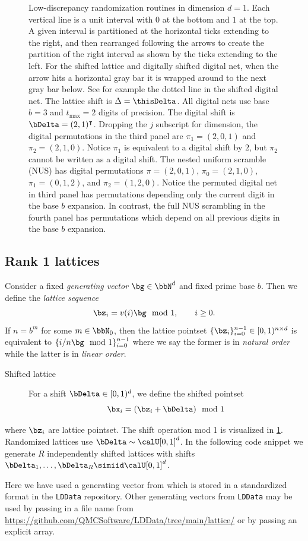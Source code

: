 \documentclass[acmsmall]{acmart}
\begin{document}
\begin{figure}
    \caption{Low-discrepancy randomization routines in dimension $d=1$. Each vertical line is a unit interval with $0$ at the bottom and $1$ at the top. A given interval is partitioned at the horizontal ticks extending to the right, and then rearranged following the arrows to create the partition of the right interval as shown by the ticks extending to the left. For the shifted lattice and digitally shifted digital net, when the arrow hits a horizontal gray bar it is wrapped around to the next gray bar below. See for example the dotted line in the shifted digital net. The lattice shift is $\Delta = \thisDelta$. All digital nets use base $b=3$ and $t_\mathrm{max}=2$ digits of precision. The digital shift is $\bDelta = (2,1)^\intercal$. Dropping the $j$ subscript for dimension, the digital permutations in the third panel are $\pi_1 = (2,0,1)$ and $\pi_2 = (2,1,0)$. Notice $\pi_1$ is equivalent to a digital shift by $2$, but $\pi_2$ cannot be written as a digital shift. The nested uniform scramble (NUS) has digital permutations $\pi = (2,0,1)$, $\pi_0 = (2,1,0)$, $\pi_1 = (0,1,2)$, and $\pi_2 = (1,2,0)$. Notice the permuted digital net in third panel has permutations depending only the current digit in the base $b$ expansion. In contrast, the full NUS scrambling in the fourth panel has permutations which depend on all previous digits in the base $b$ expansion.}
    \label{fig:ld_randomizations}
\end{figure}  

\subsection{Rank 1 lattices}

Consider a fixed \emph{generating vector} $\bg \in \bbN^d$ and fixed prime base $b$. Then we define the \emph{lattice sequence} 
$$\bz_i = v(i) \bg \mod 1, \qquad i \geq 0.$$
If $n=b^m$ for some $m \in \bbN_0$, then the lattice pointset $\{\bz_i\}_{i=0}^{n-1}\in [0,1)^{n \times d}$ is equivalent to $\{i/n \bg \mod 1\}_{i=0}^{n-1}$ where we say the former is in \emph{natural order} while the latter is in \emph{linear order}. 

\begin{description}
    \item[Shifted lattice] For a shift $\bDelta \in [0,1)^d$, we define the shifted pointset 
    $$\bx_i= (\bz_i + \bDelta) \mod 1$$ 
\end{description}
where $\bz_i$ are lattice pointset. The shift operation mod 1 is visualized in \cref{fig:ld_randomizations}. Randomized lattices use $\bDelta \sim \calU[0,1]^d$. In the following code snippet we generate $R$ independently shifted lattices with shifts $\bDelta_1,\dots,\bDelta_R \simiid \calU[0,1]^d$. 

Here we have used a generating vector from \citep{cools2006constructing} which is stored in a standardized format in the \texttt{LDData} repository. Other generating vectors from \texttt{LDData} may be used by passing in a file name from \url{https://github.com/QMCSoftware/LDData/tree/main/lattice/} or by passing an explicit array. 
\end{document}
